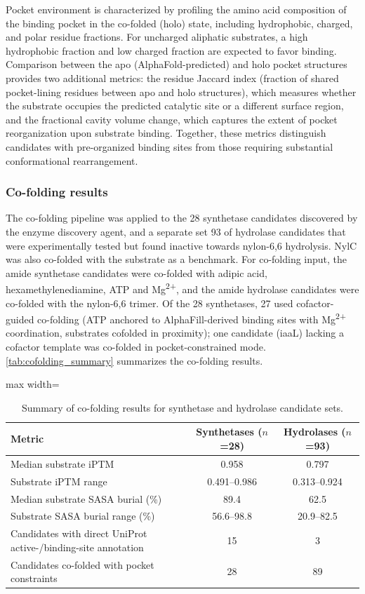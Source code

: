 \documentclass[12pt]{article}
\begin{document}
Pocket environment is characterized by profiling the amino acid composition of the binding pocket in the co-folded (holo) state, including hydrophobic, charged, and polar residue fractions. For uncharged aliphatic substrates, a high hydrophobic fraction and low charged fraction are expected to favor binding. Comparison between the apo (AlphaFold-predicted) and holo pocket structures provides two additional metrics: the residue Jaccard index (fraction of shared pocket-lining residues between apo and holo structures), which measures whether the substrate occupies the predicted catalytic site or a different surface region, and the fractional cavity volume change, which captures the extent of pocket reorganization upon substrate binding. Together, these metrics distinguish candidates with pre-organized binding sites from those requiring substantial conformational rearrangement.

\subsubsection{Co-folding results}
\label{sec:cofold_results}
The co-folding pipeline was applied to the 28 synthetase candidates discovered by the enzyme discovery agent, and a separate set 93 of hydrolase candidates that were experimentally tested but found inactive towards nylon-6,6 hydrolysis. NylC was also co-folded with the substrate as a benchmark. For co-folding input, the amide synthetase candidates were co-folded with adipic acid, hexamethylenediamine, ATP and Mg\textsuperscript{2+}, and the amide hydrolase candidates were co-folded with the nylon-6,6 trimer. Of the 28 synthetases, 27 used cofactor-guided co-folding (ATP anchored to AlphaFill-derived binding sites with Mg\textsuperscript{2+} coordination, substrates cofolded in proximity); one candidate (iaaL) lacking a cofactor template was co-folded in pocket-constrained mode. \autoref{tab:cofolding_summary} summarizes the co-folding results.

\begin{table}[H]
\centering
\caption{Summary of co-folding results for synthetase and hydrolase candidate sets.}
\label{tab:cofolding_summary}
\begin{adjustbox}{max width=\textwidth}
\begin{tabular}{lcc}
\hline
\textbf{Metric} & \textbf{Synthetases ($n$=28)} & \textbf{Hydrolases ($n$=93)} \\
\hline
Median substrate iPTM & 0.958 & 0.797 \\
Substrate iPTM range & 0.491--0.986 & 0.313--0.924 \\
Median substrate SASA burial (\%) & 89.4 & 62.5 \\
Substrate SASA burial range (\%) & 56.6--98.8 & 20.9--82.5 \\
Candidates with direct UniProt active-/binding-site annotation & 15 & 3 \\
Candidates co-folded with pocket constraints & 28 & 89 \\
\hline
\end{tabular}
\end{adjustbox}
\end{table}
\end{document}
